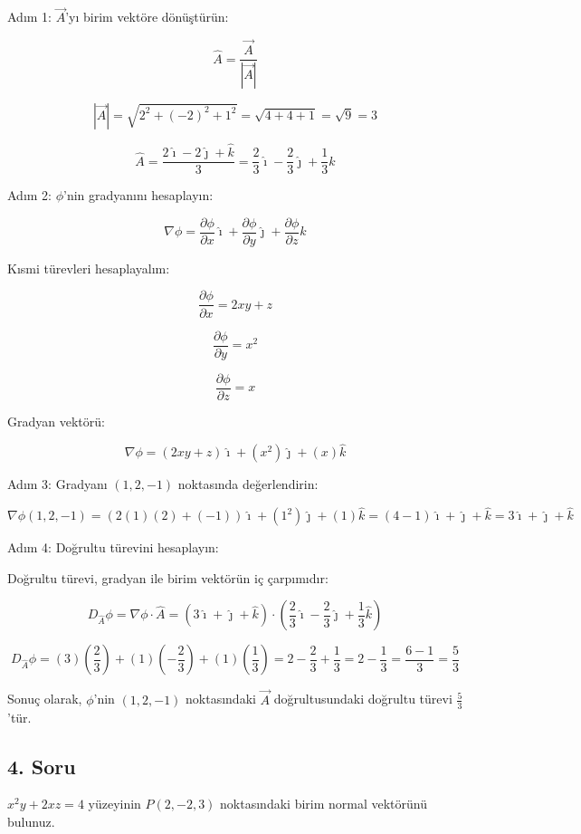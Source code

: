 \documentclass[]{fenbil}
\begin{document}
Adım 1: $\vec{A}$'yı birim vektöre dönüştürün:

\[
\hat{A} = \frac{\vec{A}}{|\vec{A}|}
\]

\[
|\vec{A}| = \sqrt{2^2 + (-2)^2 + 1^2} = \sqrt{4 + 4 + 1} = \sqrt{9} = 3
\]

\[
\hat{A} = \frac{2\hat{\imath} - 2\hat{\jmath} + \hat{k}}{3} = \frac{2}{3}\hat{\imath} - \frac{2}{3}\hat{\jmath} + \frac{1}{3}\hat{k}
\]

Adım 2: $\phi$'nin gradyanını hesaplayın:

\[
\nabla \phi = \frac{\partial \phi}{\partial x}\hat{\imath} + \frac{\partial \phi}{\partial y}\hat{\jmath} + \frac{\partial \phi}{\partial z}\hat{k}
\]

Kısmi türevleri hesaplayalım:

\[
\frac{\partial \phi}{\partial x} = 2xy + z
\]

\[
\frac{\partial \phi}{\partial y} = x^2
\]

\[
\frac{\partial \phi}{\partial z} = x
\]

Gradyan vektörü:

\[
\nabla \phi = (2xy + z)\hat{\imath} + (x^2)\hat{\jmath} + (x)\hat{k}
\]

Adım 3: Gradyanı $(1, 2, -1)$ noktasında değerlendirin:

\[
\nabla \phi (1, 2, -1) = (2(1)(2) + (-1))\hat{\imath} + (1^2)\hat{\jmath} + (1)\hat{k} = (4 - 1)\hat{\imath} + \hat{\jmath} + \hat{k} = 3\hat{\imath} + \hat{\jmath} + \hat{k}
\]

Adım 4: Doğrultu türevini hesaplayın:

Doğrultu türevi, gradyan ile birim vektörün iç çarpımıdır:

\[
D_{\hat{A}}\phi = \nabla \phi \cdot \hat{A} = (3\hat{\imath} + \hat{\jmath} + \hat{k}) \cdot \left(\frac{2}{3}\hat{\imath} - \frac{2}{3}\hat{\jmath} + \frac{1}{3}\hat{k}\right)
\]

\[
D_{\hat{A}}\phi = (3)\left(\frac{2}{3}\right) + (1)\left(-\frac{2}{3}\right) + (1)\left(\frac{1}{3}\right) = 2 - \frac{2}{3} + \frac{1}{3} = 2 - \frac{1}{3} = \frac{6-1}{3} = \frac{5}{3}
\]

Sonuç olarak, $\phi$'nin $(1, 2, -1)$ noktasındaki $\vec{A}$ doğrultusundaki doğrultu türevi $\frac{5}{3}$'tür.

\subsection*{4. Soru}

$x^2y + 2xz = 4$ yüzeyinin $P(2, -2, 3)$ noktasındaki birim normal vektörünü bulunuz.
\end{document}

